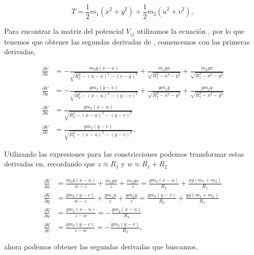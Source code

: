 \documentclass[a4paper,10pt]{article}
\numberwithin{equation}{section}
\begin{document}
\begin{equation}
 T = \frac{1}{2}m_1(\dot{x}^2+\dot{y}^2) 
 + \frac{1}{2}m_2(\dot{u}^2+\dot{v}^2),
\end{equation}

Para encontrar la matriz del potencial $V_{ij}$ utilizamos la ecuación ,
por lo que tenemos que obtener las segundas derivadas de , comencemos 
con las primeras derivadas,

\begin{align*}
 \frac{\partial V}{\partial x} &= - \frac{m_2 g (x-u)}{\sqrt{R_2^2-(u-x)^2-(v-y)^2}}+
 \frac{m_1 g x}{\sqrt{R_1^2-x^2-y^2}}+ \frac{m_2 g x}{\sqrt{R_1^2-x^2-y^2}} \\
 \frac{\partial V}{\partial y} &=  - \frac{g m_2 (y-v)}{\sqrt{R_2^2-(x-u)^2-(y-v)^2}} + 
 \frac{g m_1 y}{\sqrt{R_1^2-x^2-y^2}}+ \frac{g m_2 y}{\sqrt{R_1^2-x^2-y^2}} \\
 \frac{\partial V}{\partial u} &=  \frac{g m_2 (x-u)}{\sqrt{R_2^2-(x-u)^2-(y-v)^2}} \\
 \frac{\partial V}{\partial v} &=  \frac{g m_2 (y-v)}{\sqrt{R_2^2-(x-u)^2-(y-v)^2}},
\end{align*}

Utilizando las expresiones para las constricciones podemos transformar estas derivadas
en, recordando que $z \approx R_1$ y $w \approx R_1 + R_2$

\begin{align*}
 \frac{\partial V}{\partial x} &= \frac{m_2 g (x-u)}{w-z}+
 \frac{m_1 g x}{z}+ \frac{m_2 g x}{z} = \frac{gm_2(x-u)}{R_2} + \frac{xg (m_1+m_2)}{R_1}\\
 \frac{\partial V}{\partial y} &=  \frac{g m_2 (y-v)}{w-z} + 
 \frac{g m_1 y}{z}+ \frac{g m_2 y}{z}= \frac{gm_2(y-v)}{R_2} + \frac{yg (m_1+m_2)}{R_1} \\
 \frac{\partial V}{\partial u} &=  \frac{g m_2 (x-u)}{z-w} = 
 - \frac{g m_2 (x-u)}{R_2}\\
 \frac{\partial V}{\partial v} &=  \frac{g m_2 (y-v)}{z-w} = 
  -\frac{g m_2 (y-v)}{R_2},
\end{align*}

ahora podemos obtener las segundas derivadas que buscamos,
\end{document}
